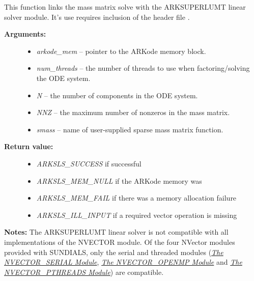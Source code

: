 \documentclass[letterpaper,10pt,english]{sphinxmanual}
\begin{document}

\begin{fulllineitems}
\label{c_interface/User_callable:ARKMassSuperLUMT}
This function links the mass matrix solve with the ARKSUPERLUMT
linear solver module.  It's use requires inclusion of the header
file .
\begin{description}
\item[{\textbf{Arguments:}}] \leavevmode\begin{itemize}
\item {} 
\emph{arkode\_mem} -- pointer to the ARKode memory block.

\item {} 
\emph{num\_threads} -- the number of threads to use when
factoring/solving the ODE system.

\item {} 
\emph{N} -- the number of components in the ODE system.

\item {} 
\emph{NNZ} -- the maximum number of nonzeros in the mass matrix.

\item {} 
\emph{smass} -- name of user-supplied sparse mass matrix function.

\end{itemize}

\item[{\textbf{Return value:}}] \leavevmode\begin{itemize}
\item {} 
\emph{ARKSLS\_SUCCESS}   if successful

\item {} 
\emph{ARKSLS\_MEM\_NULL}  if the ARKode memory was 

\item {} 
\emph{ARKSLS\_MEM\_FAIL}  if there was a memory allocation failure

\item {} 
\emph{ARKSLS\_ILL\_INPUT} if a required vector operation is missing

\end{itemize}

\end{description}

\textbf{Notes:}  The ARKSUPERLUMT linear solver is not compatible with all
implementations of the NVECTOR module. Of the four NVector
modules provided with SUNDIALS, only the serial and threaded
modules ({\hyperref[nvectors/NVector_Serial:nvectors-nvserial]{\emph{The NVECTOR\_SERIAL Module}}}, {\hyperref[nvectors/NVector_OpenMP:nvectors-openmp]{\emph{The NVECTOR\_OPENMP Module}}} and
{\hyperref[nvectors/NVector_Pthreads:nvectors-pthreads]{\emph{The NVECTOR\_PTHREADS Module}}}) are compatible.

\end{fulllineitems}
\end{document}
